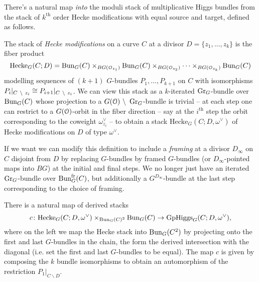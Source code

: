\documentclass[10pt, oneside]{article}
\newcommand{\hecke}{\mathrm{Hecke}}
\begin{document}
There's a natural map \emph{into} the moduli stack of multiplicative Higgs bundles from the stack of $k^{\text{th}}$ order Hecke modifications with equal source and target, defined as follows.

\begin{definition}
The stack of \emph{Hecke modifications} on a curve $C$ at a divisor $D = \{z_1, \ldots, z_k\}$ is the fiber product
\[\hecke_G(C;D) = \bun_G(C) \times_{BG(\OO_{z_1})} \bun_G(C) \times_{BG(\OO_{z_2})} \cdots \times_{BG(\OO_{z_k})} \bun_G(C)\]
modelling sequences of $(k+1)$ $G$-bundles $P_1, \ldots, P_{k+1}$ on $C$ with isomorphisms $P_i|_{C \ \backslash \  z_i} \cong P_{i+1}|_{C \ \backslash \  z_i}$.  We can view this stack as a $k$-iterated $\operatorname{Gr}_G$-bundle over $\operatorname{Bun}_G(C)$ whose projection to a $G(\mathcal{O}) \ \backslash \  \operatorname{Gr}_G$-bundle is trivial -- at each step one can restrict to a $G(\mathcal{O})$-orbit in the fiber direction -- say at the $i^{\text{th}}$ step the orbit corresponding to the coweight $\omega^\vee_{z_i}$ -- to obtain a stack $\hecke_G(C;D,\omega^\vee)$ of Hecke modifications on $D$ of type $\omega^\vee$.

If we want we can modify this definition to include a \emph{framing} at a divisor $D_\infty$ on $C$ disjoint from $D$ by replacing $G$-bundles by framed $G$-bundles (or $D_\infty$-pointed maps into $BG$) at the initial and final steps.  We no longer just have an iterated $\operatorname{Gr}_G$-bundle over $\operatorname{Bun}_G^{\mathrm{fr}}(C)$, but additionally a $G^{D_\infty}$-bundle at the last step corresponding to the choice of framing.
\end{definition}

\begin{prop}
There is a natural map of derived stacks
\[c \colon \hecke_G(C;D,\omega^\vee) \times_{\bun_G(C)^2} \bun_G(C) \to \mr{GpHiggs}_G(C; D, \omega^\vee),\]
where on the left we map the Hecke stack into $\operatorname{Bun}_G(C^2)$ by projecting onto the first and last $G$-bundles in the chain, the form the derived intersection with the diagonal (i.e. set the first and last $G$-bundles to be equal).  The map $c$ is given by composing the $k$ bundle isomorphisms to obtain an automorphism of the restriction $P_1|_{C\backslash D}$.
\end{prop}
\end{document}
